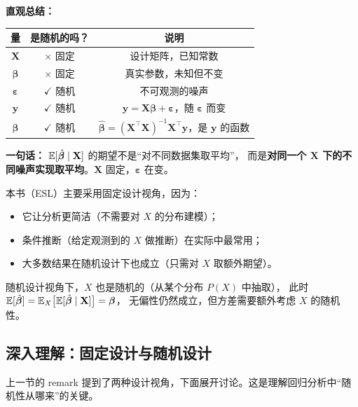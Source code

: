 \medskip
\noindent
\textbf{直观总结：}

\begin{center}
\renewcommand{\arraystretch}{1.4}
\begin{tabular}{c|c|c}
\toprule
\textbf{量} & \textbf{是随机的吗？} & \textbf{说明} \\
\midrule
$\mathbf{X}$       & {\scriptsize $\times$} 固定  & 设计矩阵，已知常数 \\
$\bm{\beta}$       & {\scriptsize $\times$} 固定  & 真实参数，未知但不变 \\
$\bm{\varepsilon}$ & {\scriptsize $\checkmark$} 随机  & 不可观测的噪声 \\
$\mathbf{y}$       & {\scriptsize $\checkmark$} 随机  & $\mathbf{y} = \mathbf{X}\bm{\beta} + \bm{\varepsilon}$，随 $\bm{\varepsilon}$ 而变 \\
$\hat{\bm{\beta}}$ & {\scriptsize $\checkmark$} 随机  & $\hat{\bm{\beta}} = (\mathbf{X}^\top \mathbf{X})^{-1} \mathbf{X}^\top \mathbf{y}$，是 $\mathbf{y}$ 的函数 \\
\bottomrule
\end{tabular}
\end{center}

\textbf{一句话：} $\mathbb{E}[\hat{\bm{\beta}} \mid \mathbf{X}]$ 的期望不是``对不同数据集取平均''，
而是\textbf{对同一个 $\mathbf{X}$ 下的不同噪声实现取平均}。$\mathbf{X}$ 固定，$\bm{\varepsilon}$ 在变。

\medskip
\begin{remark}
本书（ESL）主要采用固定设计视角，因为：
\begin{itemize}
    \item 它让分析更简洁（不需要对 $X$ 的分布建模）；
    \item 条件推断（给定观测到的 $X$ 做推断）在实际中最常用；
    \item 大多数结果在随机设计下也成立（只需对 $X$ 取额外期望）。
\end{itemize}

随机设计视角下，$X$ 也是随机的（从某个分布 $P(X)$ 中抽取），
此时 $\mathbb{E}[\hat{\bm{\beta}}] = \mathbb{E}_X\big[\mathbb{E}[\hat{\bm{\beta}} \mid \mathbf{X}]\big] = \bm{\beta}$，
无偏性仍然成立，但方差需要额外考虑 $X$ 的随机性。
\end{remark}

\subsection{深入理解：固定设计与随机设计}

上一节的 remark 提到了两种设计视角，下面展开讨论。这是理解回归分析中``随机性从哪来''的关键。

